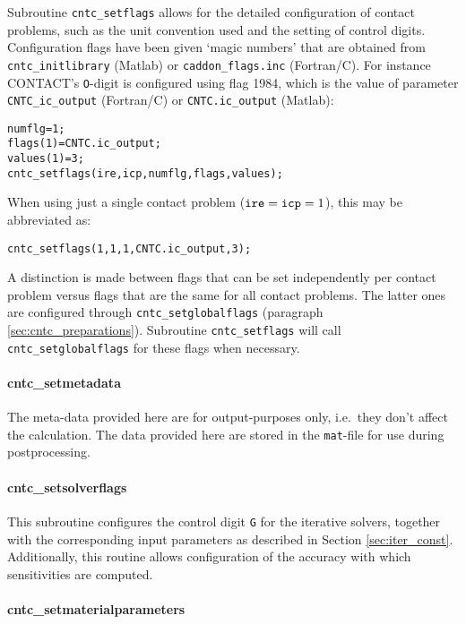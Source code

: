 \documentclass[12pt]{report}
\begin{document}
Subroutine {\tt cntc\_setflags} allows for the detailed configuration of
contact problems, such as the unit convention used and the setting of
control digits. Configuration flags have been given `magic numbers' that
are obtained from {\tt cntc\_initlibrary} (Matlab) or {\tt caddon\_flags\-.inc}
(Fortran/C). For instance CONTACT's {\tt O}-digit is configured using flag
1984, which is the value of parameter {\tt CNTC\_ic\_output} (Fortran/C) or
{\tt CNTC.ic\_output} (Matlab):
\begin{alltt}\small
    numflg    = 1;              % configure O = 3 in the CONTACT library
    flags(1)  = CNTC.ic_output;
    values(1) = 3;
    cntc_setflags(ire, icp, numflg, flags, values);
\end{alltt}
When using just a single contact problem (${\tt ire}={\tt icp}=1$), this
may be abbreviated as:
\begin{alltt}\small
    cntc_setflags(1, 1, 1, CNTC.ic_output, 3);
\end{alltt}
A distinction is made between flags that can be set independently per
contact problem versus flags that are the same for all contact problems.
The latter ones are configured through {\tt cntc\_\-set\-glo\-bal\-flags}
(paragraph \ref{sec:cntc_preparations}). Subroutine {\tt cntc\_\-set\-flags}
will call {\tt cntc\_\-set\-glo\-bal\-flags} for these flags when necessary.

\paragraph{cntc\_setmetadata}

The meta-data provided here are for output-purposes only, i.e.\ they don't
affect the calculation. The data provided here are stored in the 
{\tt mat}-file for use during postprocessing.

\paragraph{cntc\_setsolverflags}

This subroutine configures the control digit {\tt G} for the
iterative solvers, together with the corresponding input parameters as
described in Section \ref{sec:iter_const}. Additionally, this routine allows
configuration of the accuracy with which sensitivities are computed.

\paragraph{cntc\_setmaterialparameters}
\end{document}
